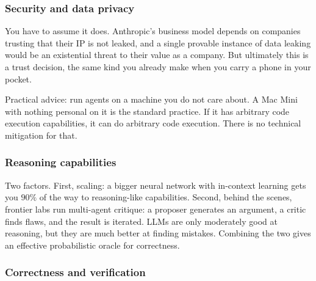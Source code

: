 \subsubsection{Security and data privacy}

\begin{audience}
  You have to assume it does.  Anthropic's business model depends on
  companies trusting that their IP is not leaked, and a single provable
  instance of data leaking would be an existential threat to their
  value as a company.  But ultimately this is a trust decision, the same
  kind you already make when you carry a phone in your pocket.

  Practical advice: run agents on a machine you do not care about.  A
  Mac Mini with nothing personal on it is the standard practice.  If it
  has arbitrary code execution capabilities, it can do arbitrary code
  execution.  There is no technical mitigation for that.
\end{audience}

\subsubsection{Reasoning capabilities}

\begin{audience}
  Two factors.  First, scaling: a bigger neural network with in-context
  learning gets you $90\%$ of the way to reasoning-like capabilities.
  Second, behind the scenes, frontier labs run multi-agent critique:
  a proposer generates an argument, a critic finds flaws, and the
  result is iterated.  LLMs are only moderately good at reasoning, but
  they are much better at finding mistakes.  Combining the two gives an
  effective probabilistic oracle for correctness.
\end{audience}

\subsubsection{Correctness and verification}

